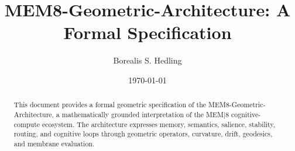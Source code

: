\documentclass[11pt]{article}
\title{MEM8-Geometric-Architecture: A Formal Specification}
\author{Borealis S. Hedling}
\date{\today}
\begin{document}
\maketitle

\begin{abstract}
This document provides a formal geometric specification of the
MEM8-Geometric-Architecture, a mathematically grounded interpretation of the
MEM|8 cognitive-compute ecosystem. The architecture expresses memory,
semantics, salience, stability, routing, and cognitive loops through geometric
operators, curvature, drift, geodesics, and membrane evaluation.
\end{abstract}

\tableofcontents











\end{document}
